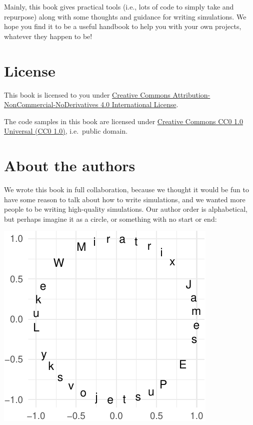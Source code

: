 \documentclass[
]{book}
\begin{document}
Mainly, this book gives practical tools (i.e., lots of code to simply take and repurpose) along with some thoughts and guidance for writing simulations.
We hope you find it to be a useful handbook to help you with your own projects, whatever they happen to be!

\section*{License}\label{license}

This book is licensed to you under \href{http://creativecommons.org/licenses/by-nc-nd/4.0/}{Creative Commons Attribution-NonCommercial-NoDerivatives 4.0 International License}.

The code samples in this book are licensed under \href{https://creativecommons.org/publicdomain/zero/1.0/}{Creative Commons CC0 1.0 Universal (CC0 1.0)}, i.e.~public domain.

\section*{About the authors}\label{about-the-authors}

We wrote this book in full collaboration, because we thought it would be fun to have some reason to talk about how to write simulations, and we wanted more people to be writing high-quality simulations.
Our author order is alphabetical, but perhaps imagine it as a circle, or something with no start or end:

\begin{center}\includegraphics[width=0.75\linewidth]{Designing-Simulations-in-R_files/figure-latex/unnamed-chunk-2-1} \end{center}
\end{document}
